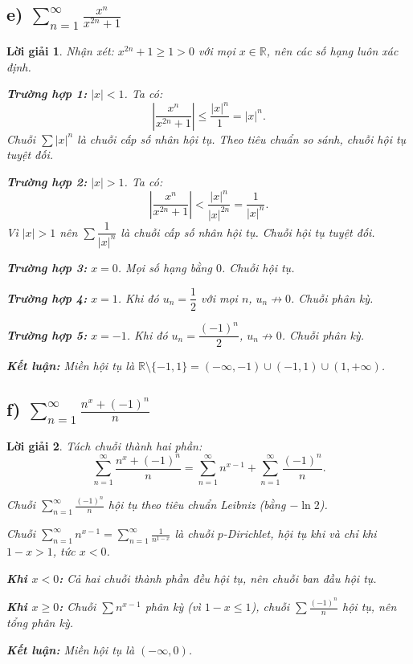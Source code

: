 \documentclass[12pt,a4paper]{article}
\newtheorem*{solution}{Lời giải}
\begin{document}
\subsection*{e) $\displaystyle\sum_{n=1}^{\infty}\frac{x^{n}}{x^{2n}+1}$}

\begin{solution}
Nhận xét: $x^{2n} + 1 \geq 1 > 0$ với mọi $x \in \mathbb{R}$, nên các số hạng luôn xác định.

\textbf{Trường hợp 1:} $|x| < 1$. Ta có:
\[
\left|\frac{x^n}{x^{2n}+1}\right| \leq \frac{|x|^n}{1} = |x|^n.
\]
Chuỗi $\sum |x|^n$ là chuỗi cấp số nhân hội tụ. Theo tiêu chuẩn so sánh, chuỗi hội tụ tuyệt đối.

\textbf{Trường hợp 2:} $|x| > 1$. Ta có:
\[
\left|\frac{x^n}{x^{2n}+1}\right| < \frac{|x|^n}{|x|^{2n}} = \frac{1}{|x|^n}.
\]
Vì $|x| > 1$ nên $\sum \dfrac{1}{|x|^n}$ là chuỗi cấp số nhân hội tụ. Chuỗi hội tụ tuyệt đối.

\textbf{Trường hợp 3:} $x = 0$. Mọi số hạng bằng $0$. Chuỗi hội tụ.

\textbf{Trường hợp 4:} $x = 1$. Khi đó $u_n = \dfrac{1}{2}$ với mọi $n$, $u_n \not\to 0$. Chuỗi phân kỳ.

\textbf{Trường hợp 5:} $x = -1$. Khi đó $u_n = \dfrac{(-1)^n}{2}$, $u_n \not\to 0$. Chuỗi phân kỳ.

\textbf{Kết luận:} Miền hội tụ là $\boxed{\mathbb{R} \setminus \{-1, 1\}} = (-\infty,-1)\cup(-1,1)\cup(1,+\infty)$.
\end{solution}

\subsection*{f) $\displaystyle\sum_{n=1}^{\infty}\frac{n^{x}+(-1)^{n}}{n}$}

\begin{solution}
Tách chuỗi thành hai phần:
\[
\sum_{n=1}^{\infty}\frac{n^{x}+(-1)^{n}}{n} = \sum_{n=1}^{\infty} n^{x-1} + \sum_{n=1}^{\infty}\frac{(-1)^n}{n}.
\]

Chuỗi $\displaystyle\sum_{n=1}^{\infty}\frac{(-1)^n}{n}$ hội tụ theo tiêu chuẩn Leibniz (bằng $-\ln 2$).

Chuỗi $\displaystyle\sum_{n=1}^{\infty} n^{x-1} = \sum_{n=1}^{\infty} \frac{1}{n^{1-x}}$ là chuỗi $p$-Dirichlet, hội tụ khi và chỉ khi $1 - x > 1$, tức $x < 0$.

\textbf{Khi $x < 0$:} Cả hai chuỗi thành phần đều hội tụ, nên chuỗi ban đầu hội tụ.

\textbf{Khi $x \geq 0$:} Chuỗi $\sum n^{x-1}$ phân kỳ (vì $1-x \leq 1$), chuỗi $\sum \frac{(-1)^n}{n}$ hội tụ, nên tổng phân kỳ.

\textbf{Kết luận:} Miền hội tụ là $\boxed{(-\infty, 0)}$.
\end{solution}
\end{document}
